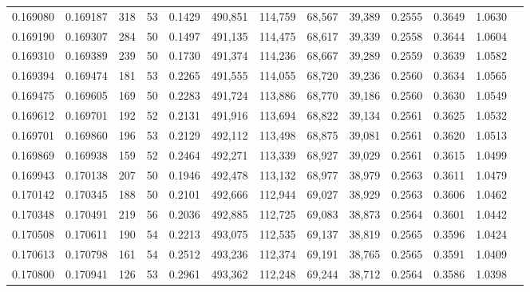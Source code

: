 \begin{tabular}{rrrrrrrrrrrrr}
0.169080 & 0.169187 &   318 &  53 &                                     0.1429 & 490,851 & 114,759 &  68,567 &  39,389 & 0.2555 & 0.3649 & 1.0630 \\
0.169190 & 0.169307 &   284 &  50 &                                     0.1497 & 491,135 & 114,475 &  68,617 &  39,339 & 0.2558 & 0.3644 & 1.0604 \\
0.169310 & 0.169389 &   239 &  50 &                                     0.1730 & 491,374 & 114,236 &  68,667 &  39,289 & 0.2559 & 0.3639 & 1.0582 \\
0.169394 & 0.169474 &   181 &  53 &                                     0.2265 & 491,555 & 114,055 &  68,720 &  39,236 & 0.2560 & 0.3634 & 1.0565 \\
0.169475 & 0.169605 &   169 &  50 &                                     0.2283 & 491,724 & 113,886 &  68,770 &  39,186 & 0.2560 & 0.3630 & 1.0549 \\
0.169612 & 0.169701 &   192 &  52 &                                     0.2131 & 491,916 & 113,694 &  68,822 &  39,134 & 0.2561 & 0.3625 & 1.0532 \\
0.169701 & 0.169860 &   196 &  53 &                                     0.2129 & 492,112 & 113,498 &  68,875 &  39,081 & 0.2561 & 0.3620 & 1.0513 \\
0.169869 & 0.169938 &   159 &  52 &                                     0.2464 & 492,271 & 113,339 &  68,927 &  39,029 & 0.2561 & 0.3615 & 1.0499 \\
0.169943 & 0.170138 &   207 &  50 &                                     0.1946 & 492,478 & 113,132 &  68,977 &  38,979 & 0.2563 & 0.3611 & 1.0479 \\
0.170142 & 0.170345 &   188 &  50 &                                     0.2101 & 492,666 & 112,944 &  69,027 &  38,929 & 0.2563 & 0.3606 & 1.0462 \\
0.170348 & 0.170491 &   219 &  56 &                                     0.2036 & 492,885 & 112,725 &  69,083 &  38,873 & 0.2564 & 0.3601 & 1.0442 \\
0.170508 & 0.170611 &   190 &  54 &                                     0.2213 & 493,075 & 112,535 &  69,137 &  38,819 & 0.2565 & 0.3596 & 1.0424 \\
0.170613 & 0.170798 &   161 &  54 &                                     0.2512 & 493,236 & 112,374 &  69,191 &  38,765 & 0.2565 & 0.3591 & 1.0409 \\
0.170800 & 0.170941 &   126 &  53 &                                     0.2961 & 493,362 & 112,248 &  69,244 &  38,712 & 0.2564 & 0.3586 & 1.0398 \\

\end{tabular}
